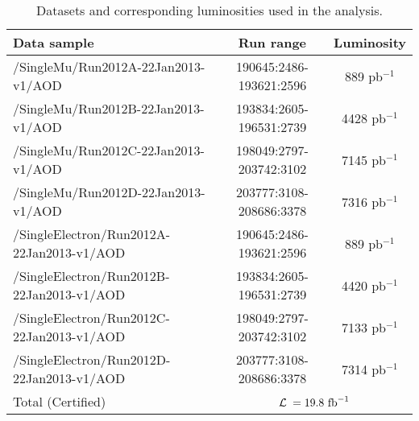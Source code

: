 \begin{table}[htb]
\caption{Datasets and corresponding luminosities used in the analysis.} 
\begin{center}
\footnotesize
\begin{tabular}{|l|c|c|}\hline
  Data sample & Run range &  Luminosity \\ \hline
  /SingleMu/Run2012A-22Jan2013-v1/AOD &  190645:2486-193621:2596 & 889 pb$^{-1}$  \\
  /SingleMu/Run2012B-22Jan2013-v1/AOD &  193834:2605-196531:2739 & 4428 pb$^{-1}$   \\
  /SingleMu/Run2012C-22Jan2013-v1/AOD &  198049:2797-203742:3102 & 7145 pb$^{-1}$   \\
  /SingleMu/Run2012D-22Jan2013-v1/AOD &  203777:3108-208686:3378 & 7316 pb$^{-1}$ \\\hline  \hline
  /SingleElectron/Run2012A-22Jan2013-v1/AOD &  190645:2486-193621:2596 & 889 pb$^{-1}$  \\
  /SingleElectron/Run2012B-22Jan2013-v1/AOD &  193834:2605-196531:2739 & 4420 pb$^{-1}$   \\
  /SingleElectron/Run2012C-22Jan2013-v1/AOD &  198049:2797-203742:3102 & 7133 pb$^{-1}$   \\
  /SingleElectron/Run2012D-22Jan2013-v1/AOD &  203777:3108-208686:3378 & 7314 pb$^{-1}$ \\\hline  \hline
  
  Total (Certified) & \multicolumn{2}{|c|}{ $\cal{L}$ $= 19.8~{\rm fb}^{-1}$ } \\ \hline
\end{tabular}
\label{tab:datasample}
\end{center}
\end{table}



